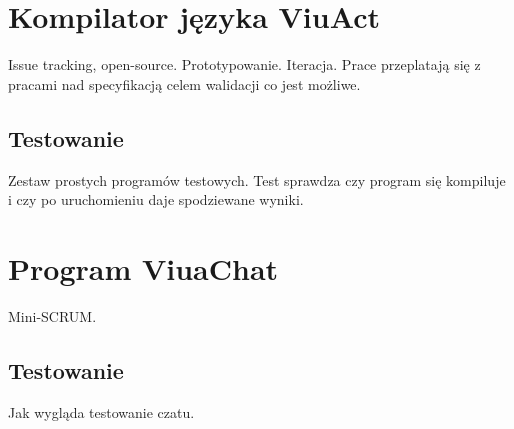 \section{Kompilator języka ViuAct}

Issue tracking, open-source. Prototypowanie. Iteracja.
Prace przeplatają się z pracami nad specyfikacją celem walidacji co jest możliwe.

\subsection{Testowanie}

Zestaw prostych programów testowych. Test sprawdza czy program się kompiluje i czy po uruchomieniu daje
spodziewane wyniki.

\section{Program ViuaChat}

Mini-SCRUM.

\subsection{Testowanie}

Jak wygląda testowanie czatu.
